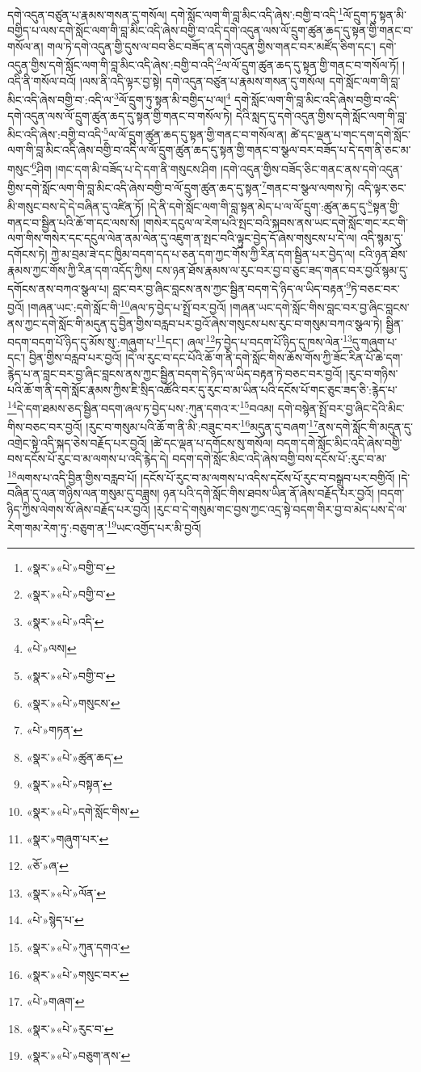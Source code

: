 དགེ་འདུན་བཙུན་པ་རྣམས་གསན་དུ་གསོལ། དགེ་སློང་ལག་གི་བླ་མིང་འདི་ཞེས་:བགྱི་བ་འདི་\footnote{«སྣར་»«པེ་»བགྱི་བ་}ལོ་དྲུག་ཏུ་སྟན་མི་བགྱིད་པ་ལས་དགེ་སློང་ལག་གི་བླ་མིང་འདི་ཞེས་བགྱི་བ་འདི་དགེ་འདུན་ལས་ལོ་དྲུག་ཚུན་ཆད་དུ་སྟན་གྱི་གནང་བ་གསོལ་ན། གལ་ཏེ་དགེ་འདུན་གྱི་དུས་ལ་བབ་ཅིང་བཟོད་ན་དགེ་འདུན་གྱིས་གནང་བར་མཛོད་ཅིག་དང་། དགེ་འདུན་གྱིས་དགེ་སློང་ལག་གི་བླ་མིང་འདི་ཞེས་:བགྱི་བ་འདི་\footnote{«སྣར་»«པེ་»བགྱི་བ་}ལ་ལོ་དྲུག་ཚུན་ཆད་དུ་སྟན་གྱི་གནང་བ་གསོལ་ཏོ། །འདི་ནི་གསོལ་བའོ། །ལས་ནི་འདི་ལྟར་བྱ་སྟེ། དགེ་འདུན་བཙུན་པ་རྣམས་གསན་དུ་གསོལ། དགེ་སློང་ལག་གི་བླ་མིང་འདི་ཞེས་བགྱི་བ་:འདི་ལ་\footnote{«སྣར་»«པེ་»འདི་}ལོ་དྲུག་ཏུ་སྟན་མི་བགྱིད་པ་ལ།\footnote{«པེ་»ལས།} དགེ་སློང་ལག་གི་བླ་མིང་འདི་ཞེས་བགྱི་བ་འདི་དགེ་འདུན་ལས་ལོ་དྲུག་ཚུན་ཆད་དུ་སྟན་གྱི་གནང་བ་གསོལ་ཏེ། དེའི་སླད་དུ་དགེ་འདུན་གྱིས་དགེ་སློང་ལག་གི་བླ་མིང་འདི་ཞེས་:བགྱི་བ་འདི་\footnote{«སྣར་»«པེ་»བགྱི་བ་}ལ་ལོ་དྲུག་ཚུན་ཆད་དུ་སྟན་གྱི་གནང་བ་གསོལ་ན། ཚེ་དང་ལྡན་པ་གང་དག་དགེ་སློང་ལག་གི་བླ་མིང་འདི་ཞེས་བགྱི་བ་འདི་ལ་ལོ་དྲུག་ཚུན་ཆད་དུ་སྟན་གྱི་གནང་བ་སྩལ་བར་བཟོད་པ་དེ་དག་ནི་ཅང་མ་གསུང་\footnote{«སྣར་»«པེ་»གསུངས་}ཤིག །གང་དག་མི་བཟོད་པ་དེ་དག་ནི་གསུངས་ཤིག །དགེ་འདུན་གྱིས་བཟོད་ཅིང་གནང་ནས་དགེ་འདུན་གྱིས་དགེ་སློང་ལག་གི་བླ་མིང་འདི་ཞེས་བགྱི་བ་ལོ་དྲུག་ཚུན་ཆད་དུ་སྟན་\footnote{«པེ་»གཏན་}གནང་བ་སྩལ་ལགས་ཏེ། འདི་ལྟར་ཅང་མི་གསུང་བས་དེ་དེ་བཞིན་དུ་འཛིན་ཏོ། །དེ་ནི་དགེ་སློང་ལག་གི་བླ་སྟན་མེད་པ་ལ་ལོ་དྲུག་:ཚུན་ཆད་དུ་\footnote{«སྣར་»«པེ་»ཚུན་ཆད་}སྟན་གྱི་གནང་བ་སྦྱིན་པའི་ཆོ་ག་དང་ལས་སོ། །གསེར་དངུལ་ལ་རེག་པའི་སྤང་བའི་སྐབས་ནས་ཡང་དགེ་སློང་གང་རང་གི་ལག་གིས་གསེར་དང་དངུལ་ལེན་ནམ་ལེན་དུ་འཇུག་ན་སྤང་བའི་ལྟུང་བྱེད་དོ་ཞེས་གསུངས་པ་དེ་ལ། འདི་སྙམ་དུ་དགོངས་ཏེ། ཀྱེ་མ་བྲམ་ཟེ་དང་ཁྱིམ་བདག་དད་པ་ཅན་དག་ཀྱང་གོས་ཀྱི་རིན་དག་སྦྱིན་པར་བྱེད་ལ། ངའི་ཉན་ཐོས་རྣམས་ཀྱང་གོས་ཀྱི་རིན་དག་འདོད་ཀྱིས། ངས་ཉན་ཐོས་རྣམས་ལ་རུང་བར་བྱ་བ་ཅུང་ཟད་གནང་བར་བྱའོ་སྙམ་དུ་དགོངས་ནས་བཀའ་སྩལ་པ། བླང་བར་བྱ་ཞིང་བླངས་ནས་ཀྱང་སྦྱིན་བདག་དེ་ཉིད་ལ་ཡིད་བརྟན་\footnote{«སྣར་»«པེ་»བསྟན་}ཏེ་བཅང་བར་བྱའོ། །གཞན་ཡང་:དགེ་སློང་གི་\footnote{«སྣར་»«པེ་»དགེ་སློང་གིས་}ཞལ་ཏ་བྱེད་པ་སྤྲོ་བར་བྱའོ། །གཞན་ཡང་དགེ་སློང་གིས་བླང་བར་བྱ་ཞིང་བླངས་ནས་ཀྱང་དགེ་སློང་གི་མདུན་དུ་བྱིན་གྱིས་བརླབ་པར་བྱའོ་ཞེས་གསུངས་པས་རུང་བ་གསུམ་བཀའ་སྩལ་ཏེ། སྦྱིན་བདག་བདག་པོ་ཉིད་དུ་མོས་སུ་:གཞུག་པ་\footnote{«སྣར་»གཞུག་པར་}དང་། ཞལ་\footnote{«ཅོ་»ཞ་}ཏ་བྱེད་པ་བདག་པོ་ཉིད་དུ་ཁས་ལེན་\footnote{«སྣར་»«པེ་»ལོན་}དུ་གཞུག་པ་དང་། བྱིན་གྱིས་བརླབ་པར་བྱའོ། །དེ་ལ་རུང་བ་དང་པོའི་ཆོ་ག་ནི་དགེ་སློང་གིས་ཆོས་གོས་ཀྱི་ཟོང་རིན་པོ་ཆེ་དག་རྙེད་པ་ན་བླང་བར་བྱ་ཞིང་བླངས་ནས་ཀྱང་སྦྱིན་བདག་དེ་ཉིད་ལ་ཡིད་བརྟན་ཏེ་བཅང་བར་བྱའོ། །རུང་བ་གཉིས་པའི་ཆོ་ག་ནི་དགེ་སློང་རྣམས་ཀྱིས་ཇི་སྲིད་འཚོའི་བར་དུ་རུང་བ་མ་ཡིན་པའི་དངོས་པོ་གང་ཅུང་ཟད་ཅི་:རྙེད་པ་\footnote{«པེ་»སྙེད་པ་}དེ་དག་ཐམས་ཅད་སྦྱིན་བདག་ཞལ་ཏ་བྱེད་པས་:ཀུན་དགའ་ར་\footnote{«སྣར་»«པེ་»ཀུན་དགའ་}བའམ། དགེ་བསྙེན་སྤྲོ་བར་བྱ་ཞིང་དེའི་མིང་གིས་བཅང་བར་བྱའོ། །རུང་བ་གསུམ་པའི་ཆོ་ག་ནི་མི་:བཟུང་བར་\footnote{«སྣར་»«པེ་»གསུང་བར་}མདུན་དུ་བཞག་\footnote{«པེ་»གཞག་}ནས་དགེ་སློང་གི་མདུན་དུ་འགྲེང་སྟེ་འདི་སྐད་ཅེས་བརྗོད་པར་བྱའོ། །ཚེ་དང་ལྡན་པ་དགོངས་སུ་གསོལ། བདག་དགེ་སློང་མིང་འདི་ཞེས་བགྱི་བས་དངོས་པོ་རུང་བ་མ་ལགས་པ་འདི་རྙེད་དེ། བདག་དགེ་སློང་མིང་འདི་ཞེས་བགྱི་བས་དངོས་པོ་:རུང་བ་མ་\footnote{«སྣར་»«པེ་»རུང་བ་}ལགས་པ་འདི་བྱིན་གྱིས་བརླབ་པོ། །དངོས་པོ་རུང་བ་མ་ལགས་པ་འདིས་དངོས་པོ་རུང་བ་བསྒྲུབ་པར་བགྱིའོ། །དེ་བཞིན་དུ་ལན་གཉིས་ལན་གསུམ་དུ་བཟླས། ཉན་པའི་དགེ་སློང་གིས་ཐབས་ཡིན་ནོ་ཞེས་བརྗོད་པར་བྱའོ། །བདག་ཉིད་ཀྱིས་ལེགས་སོ་ཞེས་བརྗོད་པར་བྱའོ། །རུང་བ་དེ་གསུམ་གང་བྱས་ཀྱང་འདྲ་སྟེ་བདག་གིར་བྱ་བ་མེད་པས་དེ་ལ་རེག་གམ་རེག་ཏུ་:བཅུག་ན་\footnote{«སྣར་»«པེ་»བཅུག་ནས་}ཡང་འགྱོད་པར་མི་བྱའོ། 